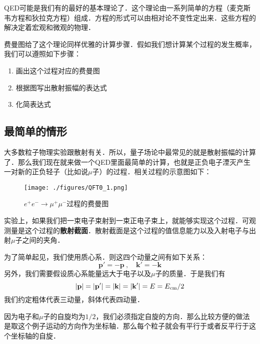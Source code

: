 
\begin{issues}
\issueTODO
\end{issues}




QED可能是我们有的最好的基本理论了．这个理论由一系列简单的方程（麦克斯韦方程和狄拉克方程）组成．方程的形式可以由相对论不变性定出来．这些方程的解决定着宏观和微观的物理．

费曼图给了这个理论同样优雅的计算步骤．假如我们想计算某个过程的发生概率，我们可以遵照如下步骤：

\begin{enumerate}
\item 画出这个过程对应的费曼图
\item 根据图写出散射振幅的表达式
\item 化简表达式
\end{enumerate}

\subsection{最简单的情形}
大多数粒子物理实验跟散射有关．所以，量子场论中最常见的就是散射振幅的计算了．那么我们现在就来做一个QED里面最简单的计算，也就是正负电子湮灭产生一对新的正负轻子（比如说$\mu$子）的过程．相关过程的示意图如下：

\begin{figure}[ht]
\centering
\texttt{[image: ./figures/QFT0\_1.png]}
\caption{$e^+e^-\rightarrow\mu^+\mu^-$过程的费曼图} \label{QFT0_fig1}
\end{figure}

实验上，如果我们把一束电子束射到一束正电子束上，就能够实现这个过程．可观测量是这个过程的\textbf{散射截面}．散射截面是这个过程的值信息能力以及入射电子与出射$\mu$子之间的夹角．

为了简单起见，我们使用质心系．则这四个动量之间有如下关系：
\begin{equation}
\mathbf p' = - \mathbf p~, \quad \mathbf k'=-\mathbf k
\end{equation}
另外，我们需要假设质心系能量远大于电子以及$\mu$子的质量．于是我们有
\begin{equation}
|\mathbf p| = |\mathbf p'| = |\mathbf k| = |\mathbf k'| = E = E_{\rm cm}/2
\end{equation}
我们约定粗体代表三动量，斜体代表四动量．

因为电子和$\mu$子的自旋均为$1/2$，我们必须指定自旋的方向．那么比较方便的做法是取这个例子运动的方向作为坐标轴．那么每个粒子就会有平行于或者反平行于这个坐标轴的自旋．

